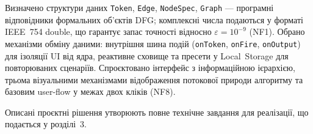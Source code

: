 Визначено структури даних \texttt{Token}, \texttt{Edge}, \texttt{NodeSpec},
\texttt{Graph} --- програмні відповідники формальних об'єктів DFG;
комплексні числа подаються у форматі IEEE~754 double, що гарантує запас
точності відносно \(\varepsilon=10^{-9}\) (NF1). Обрано механізми обміну
даними: внутрішня шина подій (\texttt{onToken}, \texttt{onFire},
\texttt{onOutput}) для ізоляції UI від ядра, реактивне сховище та
пресети у Local~Storage для повторюваних сценаріїв. Спроєктовано
інтерфейс з інформаційною ієрархією, трьома візуальними механізмами
відображення потокової природи алгоритму та базовим user-flow у межах
двох кліків (NF8).

Описані проєктні рішення утворюють повне технічне завдання для
реалізації, що подається у розділі~3.